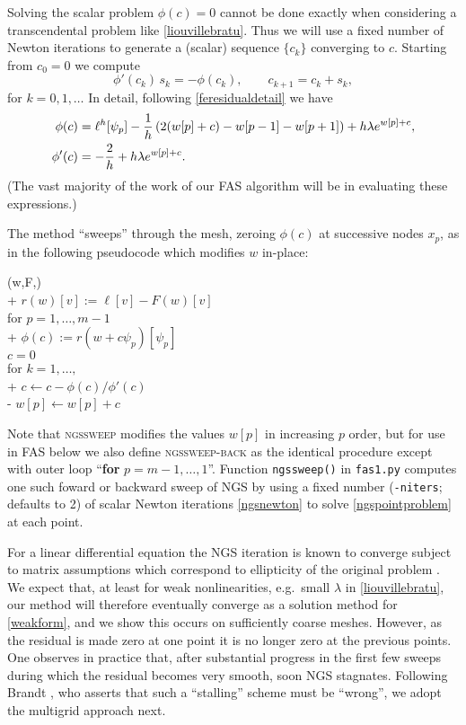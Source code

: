 \documentclass[letterpaper,final,12pt,reqno]{amsart}
\begin{document}
Solving the scalar problem $\phi(c)=0$ cannot be done exactly when considering a transcendental problem like \eqref{liouvillebratu}.  Thus we will use a fixed number of Newton iterations \cite[Chapter 4]{Bueler2021} to generate a (scalar) sequence $\{c_k\}$ converging to $c$.  Starting from $c_0=0$ we compute
\begin{equation}
\phi'(c_k)\, s_k = -\phi(c_k),  \qquad  c_{k+1} = c_k + s_k, \label{ngsnewton}
\end{equation}
for $k=0,1,\dots$  In detail, following \eqref{feresidualdetail} we have
\begin{align}
   \phi(c) &= \ell^h[\psi_p] - \frac{1}{h} \left(2(w[p]+c) - w[p-1] - w[p+1]\right) + h \lambda e^{w[p]+c}, \label{ngsnewtondetails} \\
   \phi'(c) &= -\frac{2}{h} + h \lambda e^{w[p]+c}. \notag
\end{align}
(The vast majority of the work of our FAS algorithm will be in evaluating these expressions.)

The method ``sweeps'' through the mesh, zeroing $\phi(c)$ at successive nodes $x_p$, as in the following pseudocode which modifies $w$ in-place:

\begin{pseudo*}
(w,F,\ell)\text{:} \\+
    $r(w)[v] := \ell[v] - F(w)[v]$ \\
    for $p=1,\dots,m-1$ \\+
        $\phi(c) := r(w + c \psi_p)[\psi_p]$ \\
        $c=0$ \\
        for $k=1,\dots,$ \\+
            $c \gets c - \phi(c) / \phi'(c)$ \\-
        $w[p] \gets w[p] + c$
\end{pseudo*}

Note that \textsc{ngssweep} modifies the values $w[p]$ in increasing $p$ order, but for use in FAS below we also define \textsc{ngssweep-back} as the identical procedure except with outer loop ``\textbf{for} $p=m-1,\dots,1$''.  Function \texttt{ngssweep()} in \texttt{fas1.py} computes one such foward or backward sweep of NGS by using a fixed number (\texttt{-niters}; defaults to 2) of scalar Newton iterations \eqref{ngsnewton} to solve \eqref{ngspointproblem} at each point.

For a linear differential equation the NGS iteration is known to converge subject to matrix assumptions which correspond to ellipticity of the original problem \cite[for example]{Greenbaum1997}.  We expect that, at least for weak nonlinearities, e.g.~small $\lambda$ in \eqref{liouvillebratu}, our method will therefore eventually converge as a solution method for \eqref{weakform}, and we show this occurs on sufficiently coarse meshes.  However, as the residual is made zero at one point it is no longer zero at the previous points.  One observes in practice that, after substantial progress in the first few sweeps during which the residual becomes very smooth, soon NGS stagnates.  Following Brandt \cite{Brandt1977,BrandtLivne2011}, who asserts that such a ``stalling'' scheme must be ``wrong'', we adopt the multigrid approach next.
\end{document}

